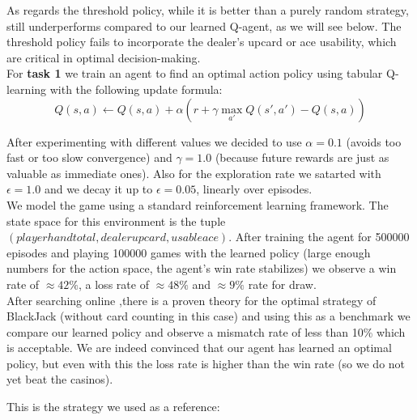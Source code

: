 \documentclass{article}
\begin{document}
\noindent As regards the threshold policy, 
while it is better than a purely random strategy, still underperforms 
compared to our learned Q-agent, as we will see below.
The threshold policy fails to incorporate the dealer’s upcard or ace usability, 
which are critical in optimal decision-making.\\


\noindent For {\bf task 1} we train an agent to find an optimal
action policy using tabular Q-learning with the following 
update formula:
\[
    Q(s,a) \leftarrow Q(s,a) + \alpha \left( r + \gamma \max_{a'} Q(s',a') - Q(s,a) \right)
\]

\noindent After experimenting with different values we 
decided to use {\bf $\alpha=0.1$} (avoids too fast or too slow convergence)
and {\bf $\gamma=1.0$} (because future rewards are just as valuable as immediate ones).
Also for the exploration rate we satarted with {\bf $\epsilon=1.0$} and
we decay it up to {\bf $\epsilon=0.05$}, linearly over episodes.\\

\noindent We model the game using a standard reinforcement learning framework.
The state space for this environment is the tuple $(player hand total,dealer upcard,usable ace)$.
After training the agent for 500000 episodes and playing
100000 games with the learned policy
(large enough numbers for the action space, the agent’s win rate stabilizes) 
we observe a win rate of $\approx 42\%$, a loss rate of $\approx 48\%$
and $\approx 9\%$ rate for draw.\\

\noindent After searching online ,there is a proven theory
for the optimal strategy of BlackJack (without card counting in this case)
and using this as a benchmark we compare our learned policy
and observe a mismatch rate of less than 10\% which is 
acceptable. We are indeed convinced that our agent
has learned an optimal policy, but even with this
the loss rate is higher than the win rate (so we do not yet beat the
casinos). 

\newpage

\noindent This is the strategy we used as a reference:\\
\end{document}
